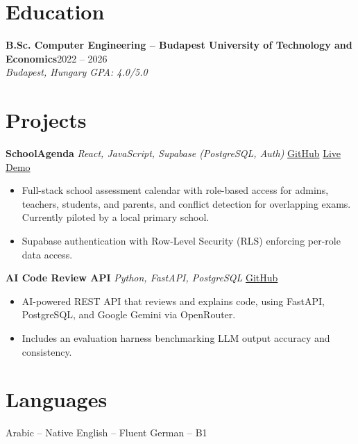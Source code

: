 \documentclass[letterpaper,10pt]{article}
\newcommand{\job}[3]{%
  \textbf{#1}\hfill #3\\
  \textit{#2}\vspace{1pt}}
\begin{document}
\section{Education}
\job{B.Sc. Computer Engineering -- Budapest University of Technology and Economics}{Budapest, Hungary \textbar{} GPA: 4.0/5.0}{2022 -- 2026}

\section{Projects}
\textbf{SchoolAgenda} \textbar{} \textit{React, JavaScript, Supabase (PostgreSQL, Auth)} \textbar{}
\href{https://github.com/alexdev/SchoolAgenda}{GitHub} \textbar{}
\href{https://school-agenda-alpha.vercel.app/}{Live Demo}
\begin{itemize}
  \item Full-stack school assessment calendar with role-based access for admins, teachers, students, and parents, and conflict detection for overlapping exams. Currently piloted by a local primary school.
  \item Supabase authentication with Row-Level Security (RLS) enforcing per-role data access.
\end{itemize}

\vspace{4pt}
\textbf{AI Code Review API} \textbar{} \textit{Python, FastAPI, PostgreSQL} \textbar{}
\href{https://github.com/alexdev/code-review-ai}{GitHub}
\begin{itemize}
  \item AI-powered REST API that reviews and explains code, using FastAPI, PostgreSQL, and Google Gemini via OpenRouter.
  \item Includes an evaluation harness benchmarking LLM output accuracy and consistency.
\end{itemize}

\section{Languages}
Arabic -- Native \textbar{} English -- Fluent \textbar{} German -- B1
\end{document}
